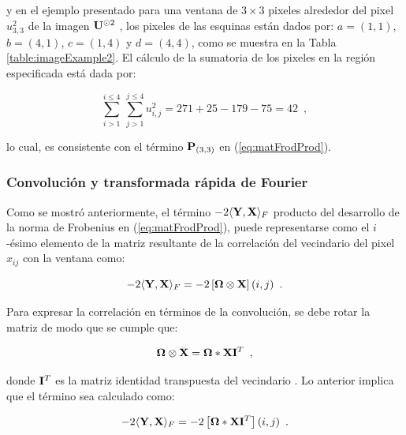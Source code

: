 {y en el ejemplo presentado para una ventana de $3\times3$ pixeles alrededor del pixel $u_{3,3}^2$ de la imagen $\mathbf{U}^{\odot2}$ , los pixeles de las esquinas est\'an dados por: $a=\left(1,1\right)$, $b=\left(4,1\right)$,
$c=\left(1,4\right)$ y $d=\left(4,4\right)$, como se muestra en la Tabla \ref{table:imageExample2}. El c\'alculo de la sumatoria de los pixeles en la regi\'on especificada est\'a dada por: 

\begin{equation}
\sum_{i>1}^{i\leq 4}~\sum_{j>1}^{j\leq 4}u_{i,j}^2=271+25-179-75=42 \enspace ,
\end{equation}

lo cual, es consistente con el t\'ermino $\mathbf{P}_{\left(3,3\right)}$ en (\ref{eq:matFrodProd}). 



\subsubsection{Convoluci\'on y transformada r\'apida de Fourier}

Como se mostr\'o anteriormente, el t\'ermino $-2\langle\mathbf{Y},\mathbf{X}\rangle_{F}$ producto del desarrollo de la norma de Frobenius en (\ref{eq:matFrodProd}), puede representarse como el $i$-\'esimo elemento de la matriz resultante de la correlaci\'on del vecindario  del pixel $x_{ij}$ con la ventana \mat{\Omega} como:

\begin{equation}
-2\langle\mathbf{Y},\mathbf{X}\rangle_{F} = -2\left[\mathbf{\Omega} \otimes \mathbf{X}\right](i,j) \enspace .
\end{equation}

Para expresar la correlaci\'on en t\'erminos de la convoluci\'on, se debe rotar la matriz  de modo que se cumple que:

\begin{equation}
\mathbf{\Omega} \otimes \mathbf{X} = \mathbf{\Omega}*\mathbf{X}\mathbf{I}^T \enspace ,
\end{equation}

donde $\mathbf{I}^T$ es la matriz identidad transpuesta del vecindario . Lo anterior implica que el t\'ermino sea calculado como:

\begin{equation}
-2\langle\mathbf{Y},\mathbf{X}\rangle_{F} = -2\left[\mathbf{\Omega} *\mathbf{X}\mathbf{I}^T\right](i,j) \enspace .
\end{equation}




}
